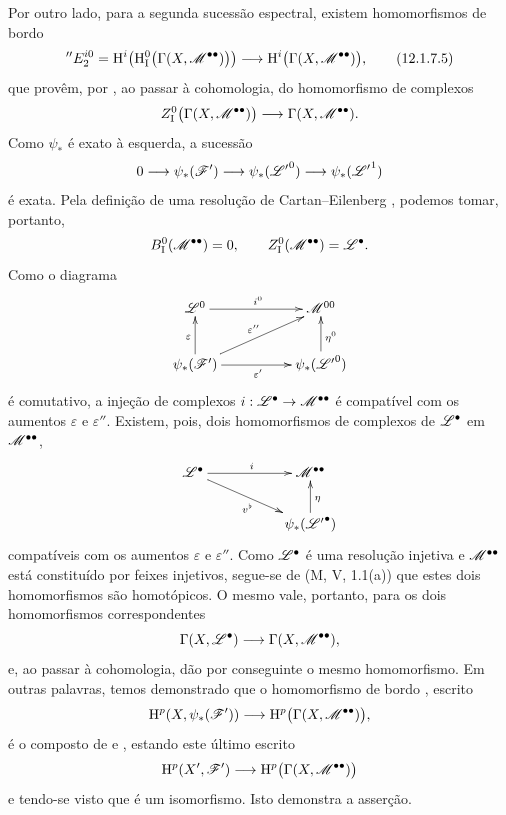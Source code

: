 \begin{env}[12.1.7]
Por outro lado, para a segunda sucessão espectral, existem homomorfismos
de bordo
\[
  {}''E_2^{i0}
  =\HH^i\!\left(
      \HH_\mathrm{I}^0
        \bigl(\Gamma(X,\sh{M}^{\bullet\bullet})\bigr)
    \right)
  \longrightarrow
  \HH^i\bigl(\Gamma(X,\sh{M}^{\bullet\bullet})\bigr),
  \tag{12.1.7.5}
  \label{0.12.1.7.5}
\]
que provêm, por , ao passar à cohomologia, do
homomorfismo de complexos
\[
  Z_\mathrm{I}^0
    \bigl(\Gamma(X,\mathscr{M}^{\bullet\bullet})\bigr)
  \longrightarrow\Gamma(X,\mathscr{M}^{\bullet\bullet}).
\]
Como $\psi_*$ é exato à esquerda, a sucessão
\[
  0\longrightarrow\psi_*(\mathscr{F}')
  \longrightarrow\psi_*({\mathscr{L}'}^0)
  \longrightarrow\psi_*({\mathscr{L}'}^1)
\]
é exata.
Pela definição de uma resolução de Cartan--Eilenberg
, podemos tomar, portanto,
\[
  B_\mathrm{I}^0(\mathscr{M}^{\bullet\bullet})=0,
  \qquad
  Z_\mathrm{I}^0(\mathscr{M}^{\bullet\bullet})=\mathscr{L}^\bullet.
\]
Como o diagrama
\[
  \xymatrix@C=50pt@R=24pt{
    \sh{L}^0\ar[r]^{i^0}
      & \sh{M}^{00}\\
    \psi_*(\sh{F}')\ar[u]^\varepsilon
      \ar[r]_{\varepsilon'}\ar[ur]^{\varepsilon''}
      & \psi_*({\sh{L}'}^0)\ar[u]_{\eta^0}
  }
\]
é comutativo, a injeção de complexos
$i:\sh{L}^\bullet\to\sh{M}^{\bullet\bullet}$ é compatível com os
aumentos $\varepsilon$ e $\varepsilon''$.
Existem, pois, dois homomorfismos de complexos de $\mathscr{L}^\bullet$
em $\mathscr{M}^{\bullet\bullet}$,
\[
  \xymatrix@C=52pt@R=22pt{
    \sh{L}^\bullet\ar[r]^i\ar[dr]_{v^\flat}
      & \sh{M}^{\bullet\bullet}\\
    & \psi_*({\sh{L}'}^\bullet)\ar[u]_\eta
  }
\]
compatíveis com os aumentos $\varepsilon$ e
$\varepsilon''$.
Como $\mathscr{L}^\bullet$ é uma resolução injetiva e
$\mathscr{M}^{\bullet\bullet}$ está constituído por feixes injetivos, segue-se
de (M, V, 1.1(a)) que estes dois homomorfismos são homotópicos.
O mesmo vale, portanto, para os dois homomorfismos correspondentes
\[
  \Gamma(X,\mathscr{L}^\bullet)
  \longrightarrow\Gamma(X,\mathscr{M}^{\bullet\bullet}),
\]
e, ao passar à cohomologia, dão por conseguinte o mesmo
homomorfismo.
Em outras palavras, temos demonstrado que o homomorfismo de bordo
, escrito
\[
  \mathrm{H}^p(X,\psi_*(\mathscr{F}'))
  \longrightarrow\mathrm{H}^p\bigl(\Gamma(X,\mathscr{M}^{\bullet\bullet})\bigr),
\]
é o composto de  e
, estando este último escrito
\[
  \mathrm{H}^p(X',\mathscr{F}')
  \longrightarrow\mathrm{H}^p\bigl(\Gamma(X,\mathscr{M}^{\bullet\bullet})\bigr)
\]
e tendo-se visto que é um isomorfismo.
Isto demonstra a asserção.
\end{env}

